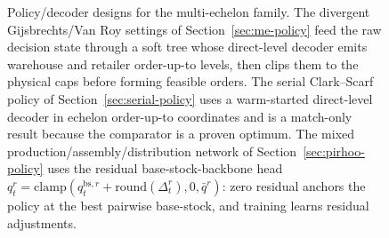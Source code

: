 \documentclass[11pt]{article}
\begin{document}
\begin{figure}[t]
{%
  }
  \caption{Policy/decoder designs for the multi-echelon family. The divergent
  Gijsbrechts/Van Roy settings of Section~\ref{sec:me-policy} feed the raw decision state
  through a soft tree whose direct-level decoder emits warehouse and retailer order-up-to levels,
  then clips them to the physical caps before forming feasible orders. The serial
  Clark--Scarf policy of Section~\ref{sec:serial-policy} uses a warm-started direct-level decoder in
  echelon order-up-to coordinates and is a match-only result because the comparator is a proven
  optimum. The mixed production/assembly/distribution network of Section~\ref{sec:pirhoo-policy}
  uses the residual base-stock-backbone head
  $q^r_t=\mathrm{clamp}(q^{\mathrm{bs},r}_t+\mathrm{round}(\Delta^r_t),0,\bar q^r)$: zero residual
  anchors the policy at the best pairwise base-stock, and training learns residual adjustments.}
  \label{fig:me-family-decoders}
\end{figure}
\end{document}
